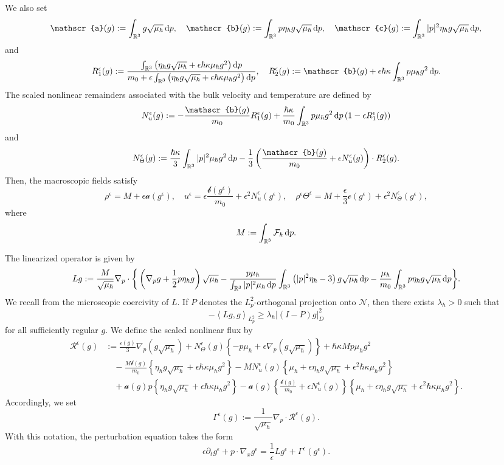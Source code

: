 \documentclass[10pt,reqno]{amsart}
\numberwithin{equation}{section}
\newcommand{\lt}{\left}
\newcommand{\rt}{\right}
\newcommand{\mR}{\mathbb{R}}
\newcommand{\intr}{\int_{\mR^3}}
\newcommand{\bq}{\begin{equation}}
\newcommand{\eq}{\end{equation}}
\newcommand{\pa}{\partial}
\newcommand{\calF}{\mathcal F}
\newcommand{\calN}{\mathcal N}
\newcommand{\calR}{\mathcal R}
\newcommand{\rdp}{\textnormal{d}p}
\begin{document}
We also set
\[
\mathscr{a}(g):=\intr g\sqrt{\mu_\hbar}\,\rdp,\quad \mathscr{b}(g):=\intr p\eta_\hbar g\sqrt{\mu_\hbar}\,\rdp,\quad \mathscr{c}(g):=\intr |p|^2\eta_\hbar g\sqrt{\mu_\hbar}\,\rdp,
\]
and
\[
R^\epsilon_1(g):=\frac{\intr \lt(\eta_\hbar g\sqrt{\mu_\hbar}+\epsilon\hbar\kappa\mu_\hbar g^2\rt)\rdp}{m_0 +\epsilon \intr \lt(\eta_\hbar g\sqrt{\mu_\hbar}+\epsilon\hbar\kappa\mu_\hbar g^2\rt)\rdp},\quad R^\epsilon_2(g):=\mathscr{b}(g)+\epsilon\hbar\kappa\intr p\mu_\hbar g^2\,\rdp.
\]
The scaled nonlinear remainders associated with the bulk velocity and temperature are defined by
\bq\label{eq:Nueps}
N^\epsilon_u(g):=-\frac{\mathscr{b}(g)}{m_0 }R^\epsilon_1(g)+\frac{\hbar\kappa}{m_0 }\intr p\mu_\hbar g^2\,\rdp\lt(1-\epsilon R^\epsilon_1(g)\rt)
\eq
and
\bq\label{eq:NTeps}
N^\epsilon_\Theta(g):=\frac{\hbar\kappa}{3}\intr |p|^2\mu_\hbar g^2\,\rdp-\frac{1}{3}\lt(\frac{\mathscr{b}(g)}{m_0 }+\epsilon N^\epsilon_u(g)\rt)\cdot R^\epsilon_2(g).
\eq
Then, the macroscopic fields satisfy
\[
\rho^\epsilon=M +\epsilon \mathscr{a}(g^\epsilon),\quad u^\epsilon=\epsilon\frac{\mathscr{b}(g^\epsilon)}{m_0 }+\epsilon^2N^\epsilon_u(g^\epsilon),\quad \rho^\epsilon \Theta^\epsilon=M +\frac{\epsilon}{3}\mathscr{c}(g^\epsilon)+\epsilon^2N^\epsilon_\Theta(g^\epsilon),
\]
where
\[
M :=\intr \calF_\hbar\,\rdp.
\]

The linearized operator is given by
\[
L  g:=\frac{M }{\sqrt{\mu_\hbar}}\nabla_p\cdot\bigg\{\lt(\nabla_pg+\frac{1}{2}p\eta_\hbar g\rt)\sqrt{\mu_\hbar}
-\frac{p\mu_\hbar}{\intr |p|^2\mu_\hbar\,\rdp}\intr \lt(|p|^2\eta_\hbar-3\rt)g\sqrt{\mu_\hbar}\,\rdp -\frac{\mu_\hbar}{m_0 }\intr p\eta_\hbar g\sqrt{\mu_\hbar}\,\rdp\bigg\}.
\]
We recall from \cite[Lemma 3.2]{CHHpre} the microscopic coercivity of $L$. If $P$ denotes the $L^2_p$-orthogonal projection onto $\calN$, then there exists $\lambda_\hbar>0$ such that
\bq\label{eq:coer-h}
-\left\langle Lg,g\right\rangle_{L^2_p} \ge \lambda_\hbar \left|(I-P)g\right|_D^2
\eq
for all sufficiently regular $g$.
We define the scaled nonlinear flux by
\bq\label{eq:R-eps}
\begin{aligned}
\calR^\epsilon(g)&:=\frac{\mathscr{c}(g)}{3}\nabla_p\lt(g\sqrt{\mu_\hbar}\rt)+N^\epsilon_\Theta(g)\lt\{-p\mu_\hbar+\epsilon\nabla_p\lt(g\sqrt{\mu_\hbar}\rt)\rt\}+\hbar\kappa M  p\mu_\hbar g^2\\
&\quad -\frac{M  \mathscr{b}(g)}{m_0 }\lt\{\eta_\hbar g\sqrt{\mu_\hbar}+\epsilon\hbar\kappa\mu_\hbar g^2\rt\}-M  N^\epsilon_u(g)\lt\{\mu_\hbar+\epsilon\eta_\hbar g\sqrt{\mu_\hbar}+\epsilon^2\hbar\kappa\mu_\hbar g^2\rt\}\\
&\quad +\mathscr{a}(g)p\lt\{\eta_\hbar g\sqrt{\mu_\hbar}+\epsilon\hbar\kappa\mu_\hbar g^2\rt\}-\mathscr{a}(g)\lt\{\frac{\mathscr{b}(g)}{m_0 }+\epsilon N^\epsilon_u(g)\rt\}\lt\{\mu_\hbar+\epsilon\eta_\hbar g\sqrt{\mu_\hbar}+\epsilon^2\hbar\kappa\mu_\hbar g^2\rt\}.
\end{aligned}
\eq
Accordingly, we set
\[
\Gamma^\epsilon(g):=\frac{1}{\sqrt{\mu_\hbar}}\nabla_p\cdot\calR^\epsilon(g).
\]
With this notation, the perturbation equation takes the form
\[
\epsilon\pa_tg^\epsilon+p\cdot\nabla_xg^\epsilon=\frac{1}{\epsilon}L  g^\epsilon+\Gamma^\epsilon(g^\epsilon).
\]
\end{document}
